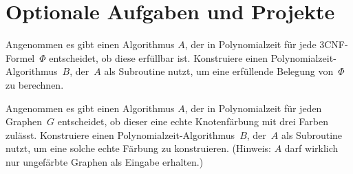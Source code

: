 \documentclass{uebung_cs}
\begin{document}

\section*{Optionale Aufgaben und Projekte}

\begin{exercise}
	Angenommen es gibt einen Algorithmus $A$, der in Polynomialzeit für jede 3CNF-Formel~$\Phi$ entscheidet, ob diese erfüllbar ist.
	Konstruiere einen Polynomialzeit-Algorithmus~$B$, der~$A$ als Subroutine nutzt, um eine erfüllende Belegung von~$\Phi$ zu berechnen.
\end{exercise}

\begin{exercise}
	Angenommen es gibt einen Algorithmus $A$, der in Polynomialzeit für jeden Graphen~$G$ entscheidet, ob dieser eine echte Knotenfärbung mit drei Farben zulässt.
	Konstruiere einen Polynomialzeit-Algorithmus~$B$, der~$A$ als Subroutine nutzt, um eine solche echte Färbung zu konstruieren.
	(Hinweis: $A$ darf wirklich nur ungefärbte Graphen als Eingabe erhalten.)
\end{exercise}

		

\end{document}
